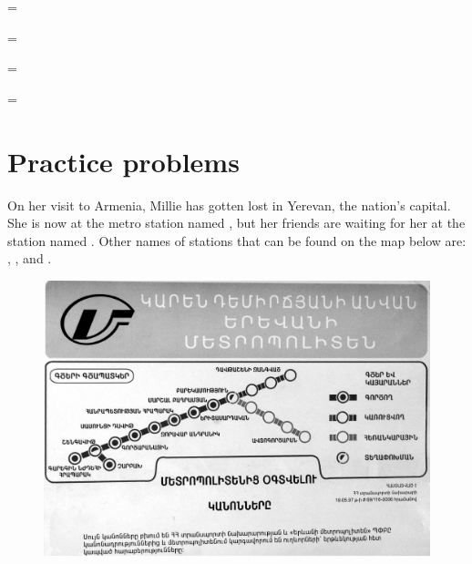 \begin{refsection}
\begin{mysolution}
\begin{solutions}
\begin{enumerate}[label = \alph*.]
    \begin{multicols}{2}
        \item[]  = 
        \item[]  = 
    \end{multicols}
    \end{enumerate}
    \item
    \begin{enumerate}[label = \alph*.]

    \begin{multicols}{2}
        \item[]  = 
        \item[]  = 
    \end{multicols}
    \end{enumerate}
\end{solutions}
\end{mysolution}

\hypertarget{practice-problems}{%
\section{Practice problems}}

\begin{problem}{\langnameArmenian}{\nameDRadev}{}
On her visit to Armenia, Millie has gotten lost in Yerevan, the nation's capital. She is now at the metro station named , but her friends are waiting for her at the station named . Other names of stations that can be found on the map below are: , ,  and .

\vfill
\begin{figure}[H]
\includegraphics[width=\linewidth]{images/Armenian_Metro}
\end{figure}
\vfill\pagebreak


\end{problem}
\end{refsection}
